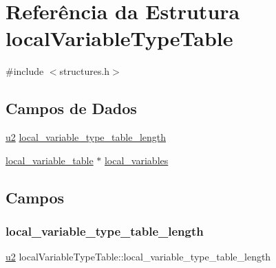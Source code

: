 \hypertarget{structlocalVariableTypeTable}{}\section{Referência da Estrutura local\+Variable\+Type\+Table}
\label{structlocalVariableTypeTable}


{\ttfamily \#include $<$structures.\+h$>$}

\subsection*{Campos de Dados}
\begin{DoxyCompactItemize}
\item 
\hyperlink{lista__operandos_8h_a732cde1300aafb73b0ea6c2558a7a54f}{u2} \hyperlink{structlocalVariableTypeTable_a9d0ce3852fcf1ee2c60d8c098caaff76}{local\+\_\+variable\+\_\+type\+\_\+table\+\_\+length}
\item 
\hyperlink{structlocal__variable__table}{local\+\_\+variable\+\_\+table} $\ast$ \hyperlink{structlocalVariableTypeTable_acb5bcd42df545b2aeb7517e01e1b5ed0}{local\+\_\+variables}
\end{DoxyCompactItemize}


\subsection{Campos}
\mbox{\label{structlocalVariableTypeTable_a9d0ce3852fcf1ee2c60d8c098caaff76}} 
\subsubsection{\texorpdfstring{local\+\_\+variable\+\_\+type\+\_\+table\+\_\+length}{local\_variable\_type\_table\_length}}
{\footnotesize\ttfamily \hyperlink{lista__operandos_8h_a732cde1300aafb73b0ea6c2558a7a54f}{u2} local\+Variable\+Type\+Table\+::local\+\_\+variable\+\_\+type\+\_\+table\+\_\+length}

\mbox{\label{structlocalVariableTypeTable_acb5bcd42df545b2aeb7517e01e1b5ed0}} 
